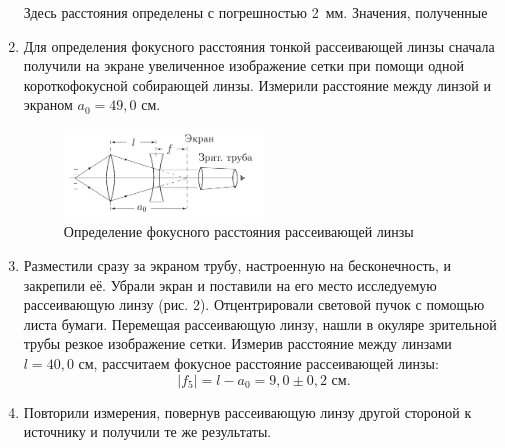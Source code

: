 \documentclass[a4paper,12pt]{article}
\begin{document}
\begin{enumerate}
		Здесь расстояния определены с погрешностью 2~мм. Значения, полученные 
		
		\item Для определения фокусного расстояния тонкой рассеивающей линзы сначала получили на экране увеличенное изображение сетки при помощи одной короткофокусной собирающей линзы. Измерили расстояние между линзой и экраном $a_0 = 49{,}0$ см.
									
		\begin{figure}
			\begin{center}
				\includegraphics[width = 0.5\textwidth]{412-2.png}
				\caption{Определение фокусного расстояния рассеивающей линзы}
			\end{center}
		\end{figure}
	
		\item Разместили сразу за экраном трубу, настроенную на бесконечность, и закрепили её. Убрали экран и поставили на его место исследуемую рассеивающую линзу (рис. 2). Отцентрировали световой пучок с помощью листа бумаги. Перемещая рассеивающую линзу, нашли в окуляре зрительной трубы резкое изображение сетки. Измерив расстояние между линзами $l = 40{,}0$ см, рассчитаем фокусное расстояние рассеивающей линзы:
		\begin{equation*}
		|f_5| = l - a_0 = 9{,}0\pm0{,}2\text{ см}.
		\end{equation*}
		
		\item Повторили измерения, повернув рассеивающую линзу другой стороной к источнику и получили те же результаты.
	\end{enumerate}
\end{document}
